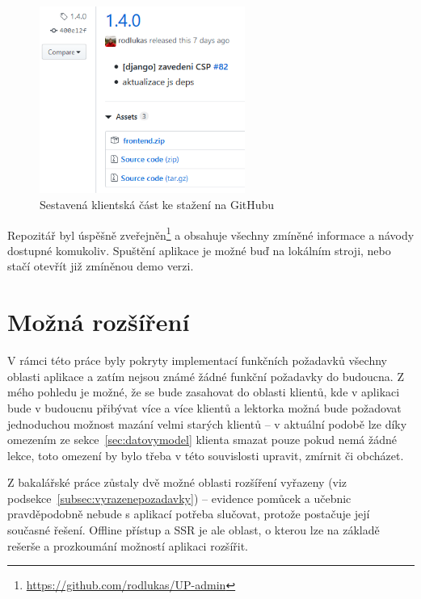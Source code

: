 \begin{figure}[h]\centering
    \includegraphics[width=0.6\textwidth]{img/gh.png}
    \caption{Sestavená klientská část ke stažení na GitHubu}\label{fig:gh}
\end{figure}

Repozitář byl úspěšně zveřejněn\footnote{\url{https://github.com/rodlukas/UP-admin}} a obsahuje všechny zmíněné informace a návody dostupné komukoliv. Spuštění aplikace je možné buď na lokálním stroji, nebo stačí otevřít již zmíněnou demo verzi.

\chapter{Možná rozšíření}

V rámci této práce byly pokryty implementací funkčních požadavků všechny oblasti aplikace a zatím nejsou známé žádné funkční požadavky do budoucna. Z mého pohledu je možné, že se bude zasahovat do oblasti klientů, kde v aplikaci bude v budoucnu přibývat více a více klientů a lektorka možná bude požadovat jednoduchou možnost mazání velmi starých klientů -- v aktuální podobě lze díky omezením ze sekce~\ref{sec:datovymodel} klienta smazat pouze pokud nemá žádné lekce, toto omezení by bylo třeba v této souvislosti upravit, zmírnit či obcházet.

Z bakalářské práce zůstaly dvě možné oblasti rozšíření vyřazeny (viz podsekce~\ref{subsec:vyrazenepozadavky}) -- evidence pomůcek a učebnic pravděpodobně nebude s aplikací potřeba slučovat, protože postačuje její současné řešení. Offline přístup a SSR je ale oblast, o kterou lze na základě rešerše a prozkoumání možností aplikaci rozšířit.

